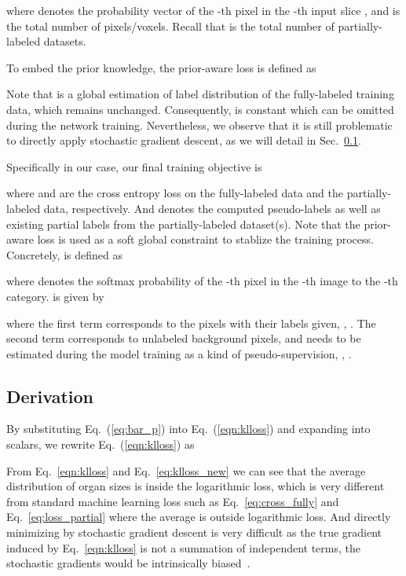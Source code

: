 \documentclass[10pt,twocolumn,letterpaper]{article}
\begin{document}
where  denotes
the probability vector of the -th pixel in the -th input slice , and  is the total number of pixels/voxels. Recall that  is the total number of partially-labeled datasets.

To embed the prior knowledge, the prior-aware loss is defined as 



Note that  is a global estimation of label distribution of the fully-labeled training data, which remains unchanged. Consequently,  is constant which can be omitted during the network training. Nevertheless, we observe that it is still problematic to directly apply stochastic gradient descent, as we will detail in Sec.~\ref{sec:derivation}.

Specifically in our case, our final training objective is

where  and  are the cross entropy loss on the fully-labeled data and the partially-labeled data, respectively. And  denotes the computed pseudo-labels as well as existing partial labels
from the partially-labeled dataset(s). Note that the prior-aware loss  is used as a soft global constraint to stablize the training process. Concretely,  is defined as

where  denotes the softmax probability of the -th pixel in the -th image to the -th category.  is given by

where the first term corresponds to the pixels with their labels  given, \ie, . The second term corresponds to unlabeled background pixels, and  needs to be estimated during the model training as a kind of pseudo-supervision, \ie, .


\subsection{Derivation} \label{sec:derivation}

By substituting Eq.~(\ref{eq:bar_p}) into Eq.~(\ref{eqn:klloss}) and expanding  into scalars,
we rewrite Eq.~(\ref{eqn:klloss}) as 

From Eq.~\eqref{eqn:klloss} and Eq.~\eqref{eq:klloss_new} we can see that the average distribution  of organ sizes is inside the logarithmic loss,
which is very different from standard machine learning loss such as Eq.~\eqref{eq:cross_fully} and Eq.~\eqref{eq:loss_partial} where the
average is outside logarithmic loss. And directly minimizing by stochastic gradient descent is very difficult as the true gradient induced by Eq.~\eqref{eqn:klloss} is not a summation of independent terms, the stochastic gradients would be intrinsically biased~\cite{liu2017unsupervised}.
\end{document}

